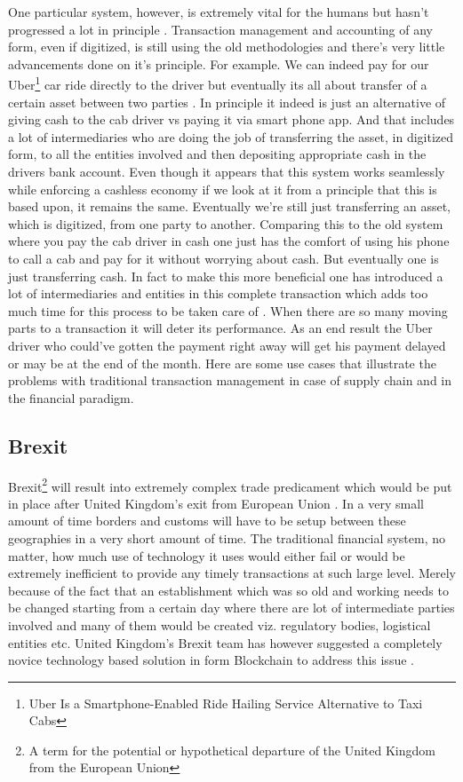 One particular system, however, is extremely vital for the humans but hasn't progressed a lot in principle \cite{lionelshriver2}. Transaction management and accounting of any form, even if digitized, is still using the old methodologies and there's very little advancements done on it's principle. For example. We can indeed pay for our Uber\footnote{Uber Is a Smartphone-Enabled Ride Hailing Service Alternative to Taxi Cabs} car ride directly to the driver but eventually its all about transfer of a certain asset between two parties \cite{uber3}. In principle it indeed is just an alternative of giving cash to the cab driver vs paying it via smart phone app. And that includes a lot of intermediaries who are doing the job of transferring the asset, in digitized form, to all the entities involved and then depositing appropriate cash in the drivers bank account. Even though it appears that this system works seamlessly while enforcing a cashless economy if we look at it from a principle that this is based upon, it remains the same. Eventually we're still just transferring an asset, which is digitized, from one party to another. Comparing this to the old system where you pay the cab driver in cash one just has the comfort of using his phone to call a cab and pay for it without worrying about cash. But eventually one is just transferring cash. In fact to make this more beneficial one has introduced a lot of intermediaries and entities in this complete transaction which adds too much time for this process to be taken care of \cite{tapscott1}. When there are so many moving parts to a transaction it will deter its performance. As an end result the Uber driver who could've gotten the payment right away will get his payment delayed or may be at the end of the month. Here are some use cases that illustrate the problems with traditional transaction management in case of supply chain and in the financial paradigm.

\subsection{Brexit}

Brexit\footnote{A term for the potential or hypothetical departure of the United Kingdom from the European Union} will result into extremely complex trade predicament which would be put in place after United Kingdom's exit from European Union \cite{nicolasbotton4}. In a very small amount of time borders and customs will have to be setup between these geographies in a very short amount of time. The traditional financial system, no matter, how much use of technology it uses would either fail or would be extremely inefficient to provide any timely transactions at such large level. Merely because of the fact that an establishment which was so old and working needs to be changed starting from a certain day where there are lot of intermediate parties involved and many of them would be created viz. regulatory bodies, logistical entities etc. United Kingdom's Brexit team has however suggested a completely novice technology based solution in form Blockchain to address this issue \cite{nicolasbotton4}.

